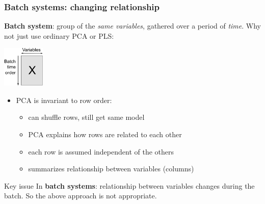 \begin{frame}\frametitle{Batch systems: changing relationship}

	\textbf{Batch system}: group of the \emph{same variables}, gathered over a period of \emph{time}.  Why not just use ordinary PCA or PLS:

	\begin{center}
		\includegraphics[width=2.0cm]{images/batch-illustrate-unusual-unfolding.png}
	\end{center}

	\begin{itemize}
		\item 	PCA is invariant to row order: 
		\begin{itemize}			
			\item	can shuffle rows, still get same model
			\item 	PCA explains how rows are related to each other
			\item 	each row is assumed independent of the others
			\item 	summarizes relationship between variables (columns)
		\end{itemize}
	\end{itemize}

	\begin{exampleblock}{Key issue}
	In \textbf{batch systems}: relationship between variables \alert{changes during the batch}.  So the above approach is not appropriate.
	\end{exampleblock}
\end{frame}

